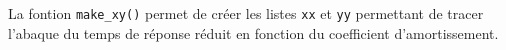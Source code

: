 \ifprof
\else

La fontion \lstinline{make_xy()} permet de créer les listes \lstinline{xx} et \lstinline{yy} permettant de tracer l'abaque du temps de réponse réduit en fonction du coefficient d'amortissement. 

%  
%    

\fi


